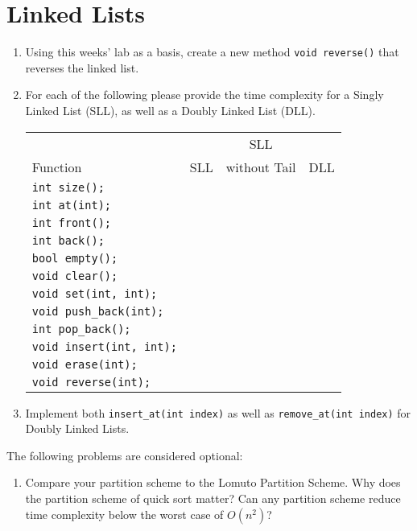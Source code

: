 \documentclass[11pt]{article}
\begin{document}
\section{Linked Lists} 
\begin{enumerate}
    \item Using this weeks' lab as a basis, create a new method \verb|void reverse()| that reverses the linked list.

    \item For each of the following please provide the time complexity for a Singly Linked List (SLL), as well as a Doubly Linked List (DLL). 
    
    \begin{tabular}{l | c | c | c}
                 &     & SLL          &  \\ 
        Function & SLL & without Tail & DLL \\ \hline
        \verb|int size();| & & & \\ \hline
        \verb|int at(int);| & & & \\ \hline
        \verb|int front();| & & & \\ \hline
        \verb|int back();| & & & \\ \hline
        \verb|bool empty();| & & & \\ \hline
        \verb|void clear();| & & & \\ \hline
        \verb|void set(int, int);| & & & \\ \hline
        \verb|void push_back(int);| & & & \\ \hline
        \verb|int pop_back();| & & & \\ \hline
        \verb|void insert(int, int);| & & & \\ \hline
        \verb|void erase(int);| & & & \\ \hline
        \verb|void reverse(int);| & & & \\ \hline
    \end{tabular}

    \item Implement both \verb|insert_at(int index)| as well as \verb|remove_at(int index)| for Doubly Linked Lists.
\end{enumerate}

The following problems are considered optional:

\begin{enumerate}
    \item Compare your partition scheme to the Lomuto Partition Scheme. Why does the partition scheme of quick sort matter? Can any partition scheme reduce time complexity below the worst case of $O(n^2)$?
\end{enumerate}

\label{r:lastpage}
\end{document}
